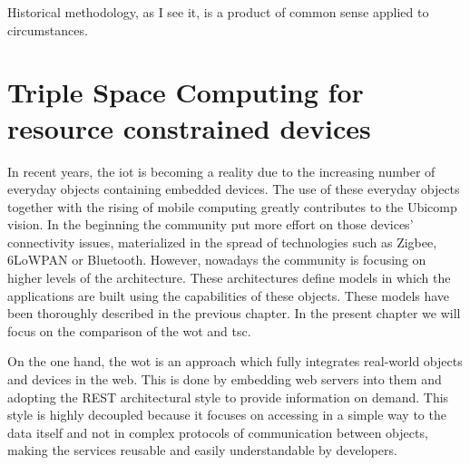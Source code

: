 

\begin{savequote}[50mm]
Historical methodology, as I see it, is a product of common sense applied to circumstances. 
\end{savequote}



\newcommand{\primquery}{\emph{query}}
\newcommand{\primread}{\emph{read}}
\newcommand{\primtake}{\emph{take}}
\newcommand{\primwrite}{\emph{write}}


\chapter{Triple Space Computing for resource constrained devices}
\label{cha:tsc}
\newcommand{\pathchapthree}{3_tsc}

\ifpdf
    \graphicspath{{\pathchapthree/figures/PNG/}{\pathchapthree/figures/PDF/}{\pathchapthree/figures/}}
\else
    \graphicspath{{\pathchapthree/figures/EPS/}{\pathchapthree/figures/}}
\fi




In recent years, the \acf{iot} is becoming a reality due to the increasing number of everyday objects containing embedded devices.
The use of these everyday objects together with the rising of mobile computing greatly contributes to the Ubicomp vision.
In the beginning the community put more effort on those devices' connectivity issues, materialized in the spread of technologies such as Zigbee, 6LoWPAN or Bluetooth.
However, nowadays the community is focusing on higher levels of the architecture.
These architectures define models in which the applications are built using the capabilities of these objects.
These models have been thoroughly described in the previous chapter.
In the present chapter we will focus on the comparison of the \acf{wot} and \acf{tsc}.

On the one hand, the \ac{wot} is an approach which fully integrates real-world objects and devices in the web.
This is done by embedding web servers into them and adopting the REST architectural style to provide information on demand.
This style is highly decoupled because it focuses on accessing in a simple way to the data itself and not in complex protocols of communication between objects, making the services reusable and easily understandable by developers.

